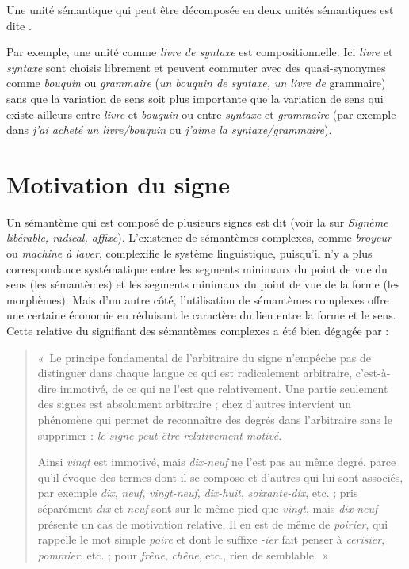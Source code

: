 {Une unité sémantique qui peut être décomposée en deux unités sémantiques est dite .}

Par exemple, une unité comme \textit{livre de syntaxe} est compositionnelle. Ici \textit{livre} et \textit{syntaxe} sont choisis librement et peuvent commuter avec des quasi-synonymes comme \textit{bouquin} ou \textit{grammaire} (\textit{un bouquin de syntaxe, un livre de} grammaire) sans que la variation de sens soit plus importante que la variation de sens qui existe ailleurs entre \textit{livre} et \textit{bouquin} ou entre \textit{syntaxe} et \textit{grammaire} (par exemple dans \textit{j’ai acheté un livre/bouquin} ou \textit{j’aime la syntaxe/grammaire}).

\section{Motivation du signe}\label{sec:2.3.2}

Un sémantème qui est composé de plusieurs signes est dit  (voir la  sur \textit{Signème libérable, radical, affixe}). L’existence de sémantèmes complexes, comme \textit{broyeur} ou \textit{machine à laver}, complexifie le système linguistique, puisqu’il n’y a plus correspondance systématique entre les segments minimaux du point de vue du sens (les sémantèmes) et les segments minimaux du point de vue de la forme (les morphèmes). Mais d’un autre côté, l’utilisation de sémantèmes complexes offre une certaine économie en réduisant le caractère  du lien entre la forme et le sens. Cette relative  du signifiant des sémantèmes complexes a été bien dégagée par \citet[180]{saussure1916cours} :

\begin{quote}
    «~Le principe fondamental de l’arbitraire du signe n’empêche pas de distinguer dans chaque langue ce qui est radicalement arbitraire, c’est-à-dire immotivé, de ce qui ne l’est que relativement. Une partie seulement des signes est absolument arbitraire ; chez d’autres intervient un phénomène qui permet de reconnaître des degrés dans l’arbitraire sans le supprimer : \textit{le signe peut être relativement motivé}.

Ainsi \textit{vingt} est immotivé, mais \textit{dix-neuf} ne l’est pas au même degré, parce qu’il évoque des termes dont il se compose et d’autres qui lui sont associés, par exemple \textit{dix}, \textit{neuf}, \textit{vingt-neuf}, \textit{dix-huit}, \textit{soixante-dix}, etc. ; pris séparément \textit{dix} et \textit{neuf} sont sur le même pied que \textit{vingt}, mais \textit{dix-neuf} présente un cas de motivation relative. Il en est de même de \textit{poirier}, qui rappelle le mot simple \textit{poire} et dont le suffixe \textit{{}-ier} fait penser à \textit{cerisier}, \textit{pommier}, etc. ; pour \textit{frêne}, \textit{chêne}, etc., rien de semblable.~»
\end{quote}


